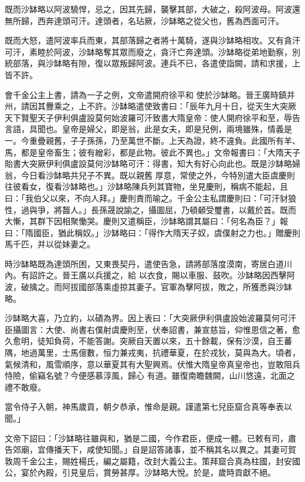 \begin{pinyinscope}
 既而沙缽略以阿波驍悍，忌之，因其先歸，襲擊其部，大破之，殺阿波母。阿波還無所歸，西奔達頭可汗。達頭者，名玷厥，沙缽略之從父也，舊為西面可汗。



 既而大怒，遣阿波率兵而東，其部落歸之者將十萬騎，遂與沙缽略相攻。又有貪汗可汗，素睦於阿波，沙缽略奪其眾而廢之，貪汗亡奔達頭。沙缽略從弟地勤察，別統部落，與沙缽略有隙，復以眾叛歸阿波。連兵不已，各遣使詣闕，請和求援，上皆不許。



 會千金公主上書，請為一子之例，文帝遣開府徐平和
 使於沙缽略。晉王廣時鎮并州，請因其釁乘之，上不許。沙缽略遣使致書曰：「辰年九月十日，從天生大突厥天下賢聖天子伊利俱盧設莫何始波羅可汗致書大隋皇帝：使人開府徐平和至，辱告言語，具聞也。皇帝是婦父，即是翁，此是女夫，即是兒例，兩境雖殊，情義是一。今重疊親舊，子子孫孫，乃至萬世不斷。上天為證，終不違負。此國所有羊、馬，都是皇帝畜生；彼有繒彩，都是此物。彼此不異也。」文帝報書曰：「大隋天子貽書大突厥伊利俱盧設莫何沙缽略可汗：得書，知大有好心向此也。既是沙缽略婦翁，今日看沙缽略共兒子不異。既以親舊
 厚意，常使之外，今特別遣大臣虞慶則往彼看女，復看沙缽略也。」沙缽略陳兵列其寶物，坐見慶則，稱病不能起，且曰：「我伯父以來，不向人拜。」慶則責而喻之。千金公主私謂慶則曰：「可汗豺狼性，過與爭，將齧人。」長孫晟說諭之，攝圖屈，乃頓顙受璽書，以戴於首。既而大慚，其群下因相聚慟哭。慶則又遣稱臣，沙缽略謂其屬曰：「何名為臣？」報曰：「隋國臣，猶此稱奴。」沙缽略曰：「得作大隋天子奴，虞僕射之力也。」贈慶則馬千匹，并以從妹妻之。



 時沙缽略既為達頭所困，又東畏契丹，遣使告急，請將部落度漠南，寄居白道川內。有詔許之。晉王廣以兵援之，給
 以衣食，賜以車服、鼓吹。沙缽略因西擊阿波，破擒之。而阿拔國部落乘虛掠其妻子。官軍為擊阿拔，敗之，所獲悉與沙缽略。



 沙缽略大喜，乃立約，以磧為界。因上表曰：「大突厥伊利俱盧設始波羅莫何可汗臣攝圖言：大使、尚書右僕射虞慶則至，伏奉詔書，兼宣慈旨，仰惟恩信之著，愈久愈明，徒知負荷，不能答謝。突厥自天置以來，五十餘載，保有沙漠，自王蕃隅，地過萬里，士馬億數，恒力兼戎夷，抗禮華夏，在於戎狄，莫與為大。頃者，氣候清和，風雪順序，意以華夏其有大聖興焉。伏惟大隋皇帝真皇帝也，豈敢阻兵恃險，偷竊名號？今便感慕淳風，歸心
 有道。雖復南瞻魏闕，山川悠遠，北面之禮不敢廢。



 當令侍子入朝，神馬歲貢，朝夕恭承，惟命是親。謹遣第七兒臣窟合真等奉表以聞。」



 文帝下詔曰：「沙缽略往雖與和，猶是二國，今作君臣，便成一體。已敕有司，肅告郊廟，宜傳播天下，咸使知聞。」自是詔答諸事，並不稱其名以異之。其妻可賀敦周千金公主，賜姓楊氏，編之屬籍，改封大義公主。策拜窟合真為柱國，封安國公，宴於內殿，引見皇后，賞勞甚厚。沙缽略大悅。於是，歲時貢獻不絕。




\end{pinyinscope}
